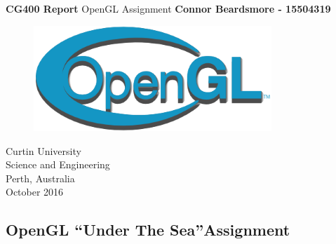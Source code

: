 \documentclass[]{article}
\begin{document}

\begin{titlepage}
	\begin{center}
		\vspace*{1cm}
		\LARGE\textbf{CG400 Report}
		\break
		OpenGL Assignment
		\vspace{1cm}
		\break
		\Large\textbf{Connor Beardsmore - 15504319} 

		\vspace{3cm}
		\begin{figure}[H]
			\begin{center}
				{ 
					\includegraphics[height=0.3\textheight,width=0.8\textwidth]{opengl.png}}
			\end{center}
		\end{figure}

		\vspace{4cm}
		\normalsize
		Curtin University \\
		Science and Engineering \\
		Perth, Australia \\
	    October 2016
	    
	\end{center}
\end{titlepage}


\vspace*{-0.8cm}
\begin{center}
	\section*{OpenGL \textquotedblleft Under The Sea\textquotedblright Assignment}
\end{center}


\vspace*{0.8cm}
\end{document}

